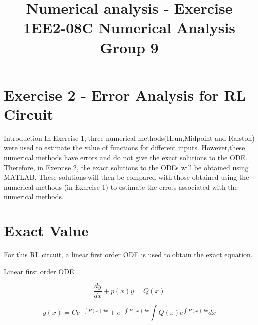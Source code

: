 \documentclass[10pt,a4paper]{article}
\title{Numerical analysis - Exercise 1}
\author{}
\date{}
\begin{document}
\vspace{-20mm}
\title{\textbf{EE2-08C Numerical Analysis} \\ Group 9\vspace{-17mm}}
\maketitle
\section{Exercise 2 - Error Analysis for RL Circuit}\vspace{-1mm}

\begin{subsection}{Introduction}
In Exercise 1, three numerical methods(Heun,Midpoint and Ralston) were used to estimate the value of functions for different inputs. However,these numerical methods have errors and do not give the exact solutions to the ODE. Therefore, in Exercise 2, the exact solutions to the ODEs will be obtained using MATLAB. These solutions will then be compared with those obtained using the numerical methods (in Exercise 1) to estimate the errors associated with the numerical methods. 
\end{subsection}
\section{Exact Value}
For this RL circuit, a linear first order ODE is used to obtain the exact equation.
\begin{subsection}{Linear first order ODE}

\begin{equation}
\frac{dy}{dx}+p(x)y=Q(x)
\end{equation}

\begin{equation}
y(x)=Ce^{-\int{P(x)dx}}+e^{-\int{P(x)dx}}\int{Q(x)e^{\int{P(x)dx}}dx}
\end{equation}

\end{subsection}
\end{document}
